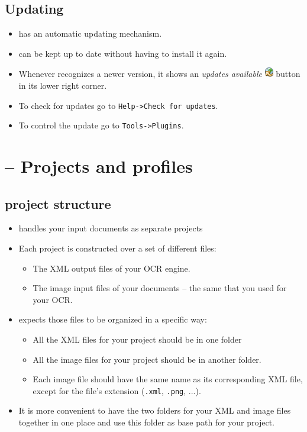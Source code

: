 \subsection{Updating}
\begin{frame}
	\begin{itemize}
		\item \pocoto{} has an automatic updating mechanism.
		\item \pocoto{} can be kept up to date without having to install it again.
		\item Whenever \pocoto recognizes a newer version, it shows an \emph{updates
			available} \includegraphics{../presentations/images/update-baloon.png}
			button in its lower right corner.
		\item To check for updates go to \texttt{Help->Check for updates}.
		\item To control the update go to \texttt{Tools->Plugins}.
	\end{itemize}
\end{frame}

\section{\pocoto{} -- Projects and profiles}
\subsection{\pocoto{} project structure}
\begin{frame}
	\begin{itemize}
		\item \pocoto{} handles your input documents as separate projects
		\item Each project is constructed over a set of different files:
			\begin{itemize}
				\item The XML output files of your OCR engine.
				\item The image input files of your documents -- the same that you
					used for your OCR.
			\end{itemize}
		\item \pocoto{} expects those files to be organized in a specific way:
			\begin{itemize}
				\item All the XML files for your project should be in one folder
				\item All the image files for your project should be in another
					folder.
				\item Each image file should have the same name as its corresponding
					XML
					file, except for the file's extension (\texttt{.xml},
					\texttt{.png}, ...).
			\end{itemize}
		\item It is more convenient to have the two folders for your XML and image
			files together in one place and use this folder as base path for
			your project.
	\end{itemize}
\end{frame}

